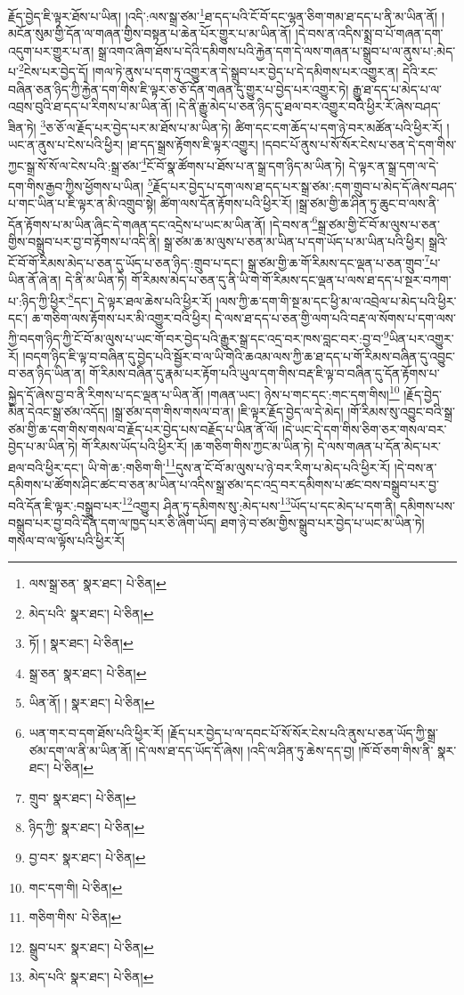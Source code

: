 རྗོད་བྱེད་ཇི་ལྟར་ཐོས་པ་ཡིན། །འདི་:ལས་སྒྲ་ཙམ་\footnote{ལས་སྒྲ་ཅན་  སྣར་ཐང་།  པེ་ཅིན། }ཐ་དད་པའི་ངོ་བོ་དང་ལྷན་ཅིག་གམ་ཐ་དད་པ་ནི་མ་ཡིན་ནོ། །མངོན་སུམ་གྱི་དོན་ལ་གཞན་གྱིས་བསྟན་པ་ཆེན་པོར་གྱུར་པ་མ་ཡིན་ནོ། །དེ་བས་ན་འདིས་སྨྲ་བ་པོ་གཞན་དག་འདུག་པར་གྱུར་པ་ན། སྒྲ་འགའ་ཞིག་ཐོས་པ་དེའི་དམིགས་པའི་རྐྱེན་དག་དེ་ལས་གཞན་པ་སྒྲུབ་པ་ལ་ནུས་པ་:མེད་པ་\footnote{མེད་པའི་  སྣར་ཐང་།  པེ་ཅིན། }ངེས་པར་བྱེད་དོ། །གལ་ཏེ་ནུས་པ་དག་ཏུ་འགྱུར་ན་དེ་སྒྲུབ་པར་བྱེད་པ་དེ་དམིགས་པར་འགྱུར་ན། དེའི་རང་བཞིན་ཅན་ཉིད་ཀྱི་རྐྱེན་དག་གིས་ཇི་ལྟར་ཅ་ཅོ་དོན་གཞན་དུ་གྱུར་པ་བྱེད་པར་འགྱུར་ཏེ། རྒྱུ་ཐ་དད་པ་མེད་པ་ལ་འབྲས་བུའི་ཐ་དད་པ་རིགས་པ་མ་ཡིན་ནོ། །དེ་ནི་རྒྱུ་མེད་པ་ཅན་ཉིད་དུ་ཐལ་བར་འགྱུར་བའི་ཕྱིར་རོ་ཞེས་བཤད་ཟིན་ཏེ། \footnote{ཏོ། །   སྣར་ཐང་།  པེ་ཅིན། }ཅ་ཅོ་ལ་རྗོད་པར་བྱེད་པར་མ་ཐོས་པ་མ་ཡིན་ཏེ། ཚིག་དང་ངག་ཆོད་པ་དག་ཉེ་བར་མཚོན་པའི་ཕྱིར་རོ། །ཡང་ན་ནུས་པ་ངེས་པའི་ཕྱིར། །ཐ་དད་སྒྲས་རྟོགས་ཇི་ལྟར་འགྱུར། །དབང་པོ་ནུས་པ་སོ་སོར་ངེས་པ་ཅན་དེ་དག་གིས་ཀྱང་སྒྲ་སོ་སོ་ལ་ངེས་པའི་:སྒྲ་ཙམ་\footnote{སྒྲ་ཅན་  སྣར་ཐང་།  པེ་ཅིན། }ངོ་བོ་སྣ་ཚོགས་པ་ཐོས་པ་ན་སྒྲ་དག་ཉིད་མ་ཡིན་ཏེ། དེ་ལྟར་ན་སྒྲ་དག་ལ་དེ་དག་གིས་རྒྱབ་ཀྱིས་ཕྱོགས་པ་ཡིན། \footnote{ཡིན་ནོ། །   སྣར་ཐང་།  པེ་ཅིན། }རྗོད་པར་བྱེད་པ་དག་ལས་ཐ་དད་པར་སྒྲ་ཙམ་:དག་གྲུབ་པ་མེད་དོ་ཞེས་བཤད་པ་གང་ཡིན་པ་ཇི་ལྟར་ན་མི་འགྲུབ་སྟེ། ཚིག་ལས་དོན་རྟོགས་པའི་ཕྱིར་རོ། །སྒྲ་ཙམ་གྱི་ཆ་ཤིན་ཏུ་ཆུང་བ་ལས་ནི་དོན་རྟོགས་པ་མ་ཡིན་ཞིང་དེ་གཞན་དང་འདྲེས་པ་ཡང་མ་ཡིན་ནོ། །དེ་བས་ན་\footnote{ཡན་གར་བ་དག་ཐོས་པའི་ཕྱིར་རོ། །རྗོད་པར་བྱེད་པ་ལ་དབང་པོ་སོ་སོར་ངེས་པའི་ནུས་པ་ཅན་ཡོད་ཀྱི་སྒྲ་ཙམ་དག་ལ་ནི་མ་ཡིན་ནོ། །དེ་ལས་ཐ་དད་ཡོད་དོ་ཞེས། །འདི་ལ་ཤིན་ཏུ་ཆེས་དད་བྱ། །ཁོ་བོ་ཅག་གིས་ནི་  སྣར་ཐང་།  པེ་ཅིན། }སྒྲ་ཙམ་གྱི་ངོ་བོ་མ་ལུས་པ་ཅན་གྱིས་བསྒྲུབ་པར་བྱ་བ་རྟོགས་པ་འདི་ནི། སྒྲ་ཙམ་ཆ་མ་ལུས་པ་ཅན་མ་ཡིན་པ་དག་ཡོད་པ་མ་ཡིན་པའི་ཕྱིར། སྒྲའི་ངོ་བོ་གོ་རིམས་མེད་པ་ཅན་དུ་ཡོད་པ་ཅན་ཉིད་:གྲུབ་པ་དང་། སྒྲ་ཙམ་གྱི་ཆ་གོ་རིམས་དང་ལྡན་པ་ཅན་གྲུབ་\footnote{གྲུབ་  སྣར་ཐང་།  པེ་ཅིན། }པ་ཡིན་ནོ་ཞེ་ན། དེ་ནི་མ་ཡིན་ཏེ། གོ་རིམས་མེད་པ་ཅན་དུ་ནི་ཡི་གེ་གོ་རིམས་དང་ལྡན་པ་ལས་ཐ་དད་པ་སྔར་བཀག་པ་:ཉིད་ཀྱི་ཕྱིར་\footnote{ཉིད་ཀྱི་  སྣར་ཐང་།  པེ་ཅིན། }དང་། དེ་ལྟར་ཐལ་ཆེས་པའི་ཕྱིར་རོ། །ལས་ཀྱི་ཆ་དག་གི་སྔ་མ་དང་ཕྱི་མ་ལ་འབྲེལ་པ་མེད་པའི་ཕྱིར་དང་། ཆ་གཅིག་ལས་རྟོགས་པར་མི་འགྱུར་བའི་ཕྱིར། དེ་ལས་ཐ་དད་པ་ཅན་གྱི་ལག་པའི་བརྡ་ལ་སོགས་པ་དག་ལས་ཀྱི་བདག་ཉིད་ཀྱི་ངོ་བོ་མ་ལུས་པ་ཡང་གོ་བར་བྱེད་པའི་རྒྱུར་སྒྲ་དང་འདྲ་བར་ཁས་བླང་བར་:བྱ་བ་\footnote{བྱ་བར་  སྣར་ཐང་།  པེ་ཅིན། }ཡིན་པར་འགྱུར་རོ། །བདག་ཉིད་ཇི་ལྟ་བ་བཞིན་དུ་བྱེད་པའི་སྦྱོར་བ་ལ་ཡི་གེའི་ཆའམ་ལས་ཀྱི་ཆ་ཐ་དད་པ་གོ་རིམས་བཞིན་དུ་འབྱུང་བ་ཅན་ཉིད་ཡིན་ན། གོ་རིམས་བཞིན་དུ་རྣམ་པར་རྟོག་པའི་ཡུལ་དག་གིས་བརྡ་ཇི་ལྟ་བ་བཞིན་དུ་དོན་རྟོགས་པ་སྐྱེད་དོ་ཞེས་བྱ་བ་ནི་རིགས་པ་དང་ལྡན་པ་ཡིན་ནོ། །གཞན་ཡང་། ཉེས་པ་གང་དང་:གང་དག་གིས།\footnote{གང་དག་གི།  པེ་ཅིན། } །རྗོད་བྱེད་མིན་དེའང་སྒྲ་ཙམ་འདོད། །སྒྲ་ཙམ་དག་གིས་གསལ་བ་ན། །ཇི་ལྟར་རྗོད་བྱེད་ལ་དེ་མེད། །གོ་རིམས་སུ་འབྱུང་བའི་སྒྲ་ཙམ་གྱི་ཆ་དག་གིས་གསལ་བ་རྗོད་པར་བྱེད་པས་བརྗོད་པ་ཡིན་ནོ་ལོ། །དེ་ཡང་དེ་དག་གིས་ཅིག་ཅར་གསལ་བར་བྱེད་པ་མ་ཡིན་ཏེ། གོ་རིམས་ཡོད་པའི་ཕྱིར་རོ། །ཆ་གཅིག་གིས་ཀྱང་མ་ཡིན་ཏེ། དེ་ལས་གཞན་པ་དོན་མེད་པར་ཐལ་བའི་ཕྱིར་དང་། ཡི་གེ་ཆ་:གཅིག་གི་\footnote{གཅིག་གིས་  པེ་ཅིན། }དུས་ན་ངོ་བོ་མ་ལུས་པ་ཉེ་བར་རིག་པ་མེད་པའི་ཕྱིར་རོ། །དེ་བས་ན་དམིགས་པ་ཚོགས་ཤིང་ཚང་བ་ཅན་མ་ཡིན་པ་འདིས་སྒྲ་ཙམ་དང་འདྲ་བར་དམིགས་པ་ཚང་བས་བསྒྲུབ་པར་བྱ་བའི་དོན་ཇི་ལྟར་:བསྒྲུབ་པར་\footnote{སྒྲུབ་པར་  སྣར་ཐང་།  པེ་ཅིན། }འགྱུར། ཤིན་ཏུ་དམིགས་སུ་:མེད་པས་\footnote{མེད་པའི་  སྣར་ཐང་།  པེ་ཅིན། }ཡོད་པ་དང་མེད་པ་དག་ནི། དམིགས་པས་བསྒྲུབ་པར་བྱ་བའི་དོན་དག་ལ་ཁྱད་པར་ཅི་ཞིག་ཡོད། ཐག་ཉེ་བ་ཙམ་གྱིས་སྒྲུབ་པར་བྱེད་པ་ཡང་མ་ཡིན་ཏེ། གསལ་བ་ལ་ལྟོས་པའི་ཕྱིར་རོ། 
